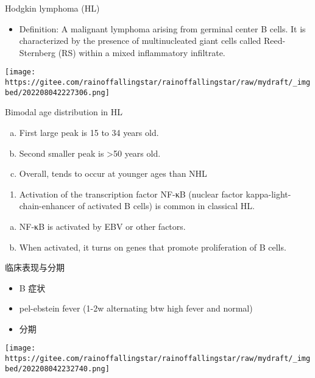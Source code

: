 \documentclass[
  ignorenonframetext,
]{beamer}
\providecommand{\tightlist}{%
  \setlength{\itemsep}{0pt}\setlength{\parskip}{0pt}}
\begin{document}
\begin{frame}
\begin{block}{Hodgkin lymphoma (HL)}
\protect\hypertarget{hodgkin-lymphoma-hl}{}
\begin{itemize}
\tightlist
\item
  Definition: A malignant lymphoma arising from germinal center B cells.
  It is characterized by the presence of multinucleated giant cells
  called Reed-Sternberg (RS) within a mixed inflammatory infiltrate.
\end{itemize}

\texttt{[image: https://gitee.com/rainoffallingstar/rainoffallingstar/raw/mydraft/\_imgbed/202208042227306.png]}
\end{block}
\end{frame}

\begin{frame}
Bimodal age distribution in HL

\begin{enumerate}
[a.]
\item
  First large peak is 15 to 34 years old.
\item
  Second smaller peak is \textgreater50 years old.
\item
  Overall, tends to occur at younger ages than NHL
\end{enumerate}
\end{frame}

\begin{frame}
\begin{enumerate}
\tightlist
\item
  Activation of the transcription factor NF-κB (nuclear factor
  kappa-light-chain-enhancer of activated B cells) is common in
  classical HL.
\end{enumerate}

\begin{enumerate}
[a.]
\item
  NF-κB is activated by EBV or other factors.
\item
  When activated, it turns on genes that promote proliferation of B
  cells.
\end{enumerate}
\end{frame}

\begin{frame}
临床表现与分期

\begin{itemize}
\item
  B 症状
\item
  pel-ebstein fever (1-2w alternating btw high fever and normal)
\item
  分期
\end{itemize}

\texttt{[image: https://gitee.com/rainoffallingstar/rainoffallingstar/raw/mydraft/\_imgbed/202208042232740.png]}
\end{frame}
\end{document}
